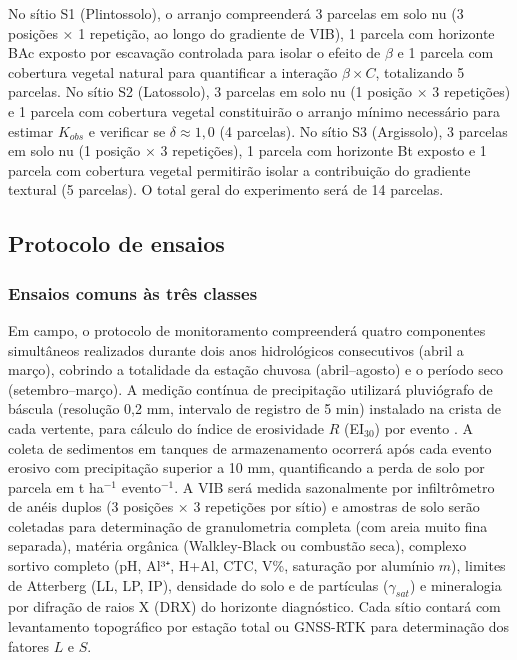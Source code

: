 \documentclass[
  brazilian,
  authoryear,
  preprint]{elsarticle}
\begin{document}
No sítio S1 (Plintossolo), o arranjo compreenderá 3 parcelas em solo nu
(3 posições × 1 repetição, ao longo do gradiente de VIB), 1 parcela com
horizonte BAc exposto por escavação controlada para isolar o efeito de
\(\beta\) e 1 parcela com cobertura vegetal natural para quantificar a
interação \(\beta \times C\), totalizando 5 parcelas. No sítio S2
(Latossolo), 3 parcelas em solo nu (1 posição × 3 repetições) e 1
parcela com cobertura vegetal constituirão o arranjo mínimo necessário
para estimar \(K_{obs}\) e verificar se \(\delta \approx 1{,}0\) (4
parcelas). No sítio S3 (Argissolo), 3 parcelas em solo nu (1 posição × 3
repetições), 1 parcela com horizonte Bt exposto e 1 parcela com
cobertura vegetal permitirão isolar a contribuição do gradiente textural
(5 parcelas). O total geral do experimento será de 14 parcelas.

\subsection{Protocolo de ensaios}\label{protocolo-de-ensaios}

\subsubsection{Ensaios comuns às três
classes}\label{ensaios-comuns-uxe0s-truxeas-classes}

Em campo, o protocolo de monitoramento compreenderá quatro componentes
simultâneos realizados durante dois anos hidrológicos consecutivos
(abril a março), cobrindo a totalidade da estação chuvosa
(abril--agosto) e o período seco (setembro--março). A medição contínua
de precipitação utilizará pluviógrafo de báscula (resolução 0,2 mm,
intervalo de registro de 5 min) instalado na crista de cada vertente,
para cálculo do índice de erosividade \(R\) (EI\(_{30}\)) por evento
\citep{wischmeier_smith_1978}. A coleta de sedimentos em tanques de
armazenamento ocorrerá após cada evento erosivo com precipitação
superior a 10 mm, quantificando a perda de solo por parcela em t
ha\(^{-1}\) evento\(^{-1}\). A VIB será medida sazonalmente por
infiltrômetro de anéis duplos (3 posições × 3 repetições por sítio) e
amostras de solo serão coletadas para determinação de granulometria
completa (com areia muito fina separada), matéria orgânica
(Walkley-Black ou combustão seca), complexo sortivo completo (pH, Al³⁺,
H+Al, CTC, V\%, saturação por alumínio \(m\)), limites de Atterberg (LL,
LP, IP), densidade do solo e de partículas (\(\gamma_{sat}\)) e
mineralogia por difração de raios X (DRX) do horizonte diagnóstico. Cada
sítio contará com levantamento topográfico por estação total ou GNSS-RTK
para determinação dos fatores \(L\) e \(S\).
\end{document}
